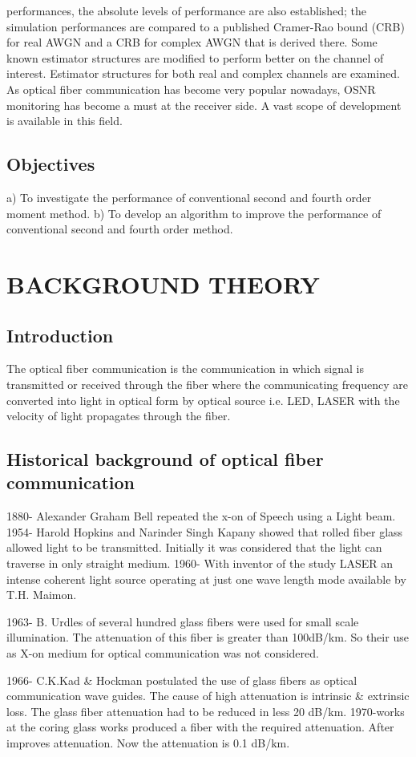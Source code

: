 \documentclass[12pt]{report}
\begin{document}
	performances, the absolute levels of performance are also established; the simulation performances are compared to a published Cramer-Rao bound (CRB) for real AWGN and a CRB for complex AWGN that is derived there. Some known estimator structures are modified to perform better on the channel of interest. Estimator structures for both real and complex channels are examined. 
	As optical fiber communication has become very popular nowadays, OSNR monitoring has become a must at the receiver side. A vast scope of development is available in this field.
	\section{Objectives }
	a) To investigate the performance of conventional second and fourth order moment method. b) To develop an algorithm to improve the performance of conventional second and fourth order method.
	\chapter{BACKGROUND THEORY}
	\section{Introduction}
	The optical fiber communication is the communication in which signal is transmitted or received through the fiber where the communicating frequency are converted into light in optical form by optical source i.e. LED, LASER with the velocity of light propagates through the fiber.
	\section{Historical background of optical fiber communication}
	1880- Alexander Graham Bell repeated the x-on of Speech using a Light beam. 
	1954- Harold Hopkins and Narinder Singh Kapany showed that rolled fiber glass allowed light to be transmitted. Initially it was considered that the light can traverse in only straight medium. 
	1960- With inventor of the study LASER an intense coherent light source operating at just one wave length mode available by T.H. Maimon. 
	
	
	1963- B. Urdles of several hundred glass fibers were used for small scale illumination. The attenuation of this fiber is greater than 100dB/km. So their use as X-on medium for optical communication was not considered. 
	
	
	1966- C.K.Kad \& Hockman postulated the use of glass fibers as optical communication wave guides. The cause of high attenuation is intrinsic \& extrinsic loss. The glass fiber attenuation had to be reduced in less 20 dB/km. 
	1970-works at the coring glass works produced a fiber with the required attenuation. After improves attenuation. Now the attenuation is 0.1 dB/km.
\end{document}
